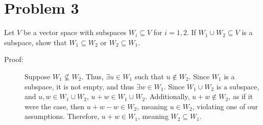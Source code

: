 \documentclass[10pt]{extarticle}
\begin{document}
  \section{Problem 3}%
  Let $V$ be a vector space with subspaces $W_i\subseteq V$ for $i=1,2$. If $W_1\cup W_2\subseteq V$ is a subspace, show that $W_1\subseteq W_2$ or $W_2\subseteq W_1$.
  \begin{description}
    \item[Proof:] Suppose $W_1\nsubseteq W_2$. Thus, $\exists u\in W_1$ such that $u\notin W_2$. Since $W_1$ is a subspace, it is not empty, and thus $\exists w\in W_1$. Since $W_1\cup W_2$ is a subspace, and $u,w\in W_1\cup W_2$, $u+w\in W_1\cup W_2$. Additionally, $u+w\notin W_2$, as if it were the case, then $u+w-w\in W_2$, meaning $u\in W_2$, violating one of our assumptions. Therefore, $u+w\in W_1$, meaning $W_2\subseteq W_1$. 
  \end{description}
\end{document}
